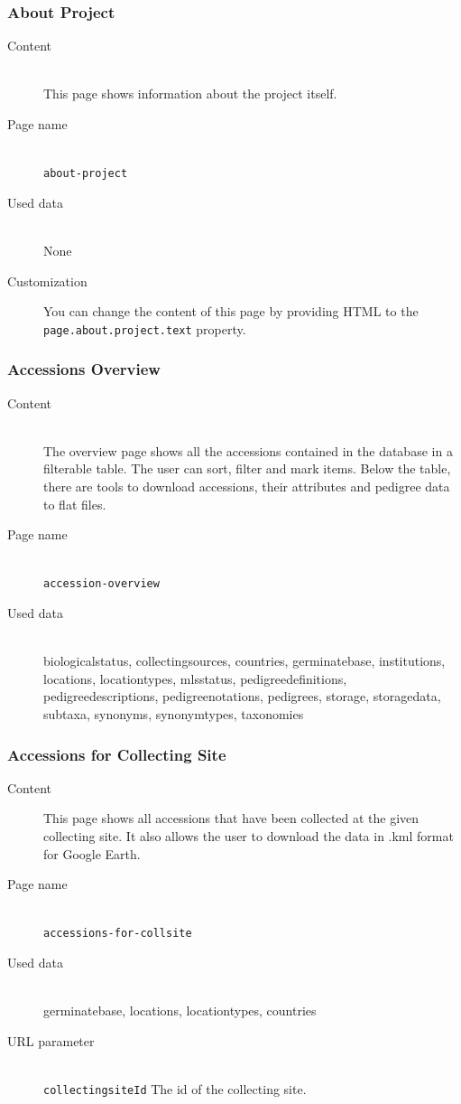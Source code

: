 \subsubsection{About Project}
\begin{description}
	\item[Content]\hfill\\This page shows information about the project itself.
	\item[Page name]\hfill\\\texttt{about-project}
	\item[Used data]\hfill\\None
	\item[Customization] You can change the content of this page by providing HTML to the \texttt{page.\allowbreak about.\allowbreak project.\allowbreak text} property.
\end{description}

\subsubsection{Accessions Overview}
\begin{description}
	\item[Content]\hfill\\The overview page shows all the accessions contained in the {\germinate} database in a filterable table. The user can sort, filter and mark items. Below the table, there are tools to download accessions, their attributes and pedigree data to flat files.
	\item[Page name]\hfill\\\texttt{accession-overview}
	\item[Used data]\hfill\\biologicalstatus, collectingsources, countries, germinatebase, institutions, locations, locationtypes, mlsstatus, pedigreedefinitions, pedigreedescriptions, pedigreenotations, pedigrees, storage, storagedata, subtaxa, synonyms, synonymtypes, taxonomies 
\end{description}

\subsubsection{Accessions for Collecting Site}
\begin{description}
	\item[Content] This page shows all accessions that have been collected at the given collecting site. It also allows the user to download the data in .kml format for Google Earth.
	\item[Page name]\hfill\\\texttt{accessions-for-collsite}
	\item[Used data]\hfill\\germinatebase, locations, locationtypes, countries
	\item[URL parameter]\hfill\\\texttt{collectingsiteId} The id of the collecting site.
\end{description}

